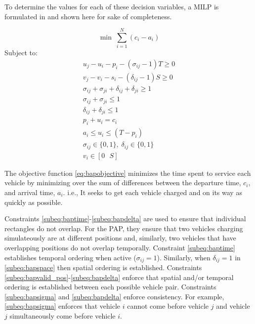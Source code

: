 \documentclass[utf8]{FrontiersinHarvard}
\begin{document}
To determine the values for each of these decision variables, a MILP is formulated in \citep{Qarebagh2019} and shown
here for sake of completeness.

\begin{equation}
	\label{eq:bapobjective}
	\min\; \sum_{i=1}^N (c_i - a_i)
\end{equation}
Subject to:
\begin{subequations}
\label{eq:bapconstrs}
\begin{align}
    u_j - u_i - p_i - (\sigma_{ij} - 1)T \geq 0   \label{subeq:baptime}         \\
    v_j - v_i - s_i - (\delta_{ij} - 1)S \geq 0   \label{subeq:bapspace}        \\
    \sigma_{ij} + \sigma_{ji} + \delta_{ij} + \delta_{ji} \geq 1 \label{subeq:bapvalid_pos}    \\
    \sigma_{ij} + \sigma_{ji} \leq 1                   \label{subeq:bapsigma}        \\
    \delta_{ij} + \delta_{ji} \leq 1                   \label{subeq:bapdelta}        \\
    p_i + u_i = c_i                       \label{subeq:bapdetach}       \\
    a_i \leq u_i \leq (T - p_i)                 \label{subeq:bapvalid_starts} \\
    \sigma_{ij} \in \{0,1\},\;\delta_{ij} \in \{0,1\}\; \label{subeq:bapsdspace}      \\
    v_i \in [0 \mbox{ } S ]                 \label{subeq:bapvspace}
\end{align}
\end{subequations}

\noindent

The objective function \eqref{eq:bapobjective} minimizes the time spent to service each vehicle by minimizing over the
sum of differences between the departure time, $c_i$, and arrival time, $a_i$. i.e., It seeks to get each vehicle
charged and on its way as quickly as possible.

Constraints \ref{subeq:baptime}-\ref{subeq:bapdelta} are used to ensure that individual rectangles do not overlap. For
the PAP, they ensure that two vehicles charging simulateously are at different positions and, similarly, two vehicles
that have overlapping positions do not overlap temporally. Constraint \eqref{subeq:baptime} establishes temporal
ordering when active ($\sigma_{ij}=1$). Similarly, when $\delta_{ij} =1$ in \eqref{subeq:bapspace} then spatial ordering is
established. Constraints \ref{subeq:bapvalid_pos}-\ref{subeq:bapdelta} enforce that spatial and/or temporal ordering is
established between each possible vehicle pair. Constraints \eqref{subeq:bapsigma} and \eqref{subeq:bapdelta} enforce
consistency. For example, \eqref{subeq:bapsigma} enforces that vehicle $i$ cannot come before vehicle $j$ and vehicle
$j$ simultaneously come before vehicle $i$.
\end{document}
